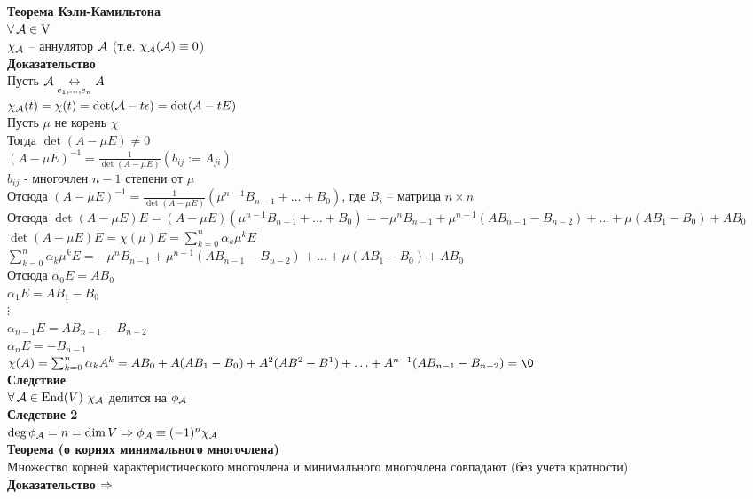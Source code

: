 \documentclass[12pt]{article}
\begin{document}
\textbf{Теорема Кэли-Камильтона}\\
$\forall\, \mathcal{A} \in \operatorname{V}$\\
$\chi_\mathcal{A}$ -- аннулятор $\mathcal{A}$ (т.е. $\chi_\mathcal{A}(\mathcal{A}) \equiv 0$)\\
\textbf{Доказательство}\\
Пусть $\mathcal{A} \underset{e_1, \ldots, e_n}{\leftrightarrow} A$\\
$\chi_\mathcal{A}(t) = \chi(t) = \det (\mathcal{A} - t\epsilon) = \det (A-tE)$\\
Пусть $\mu$ не корень $\chi$\\
Тогда $\det(A-\mu E) \neq 0$\\
$(A-\mu E)^{-1} = \frac1{\det(A - \mu E)}(b_{ij} := A_{ji})$\\
$b_{ij}$ - многочлен $n-1$ степени от $\mu$\\
Отсюда $(A-\mu E)^{-1} = \frac1{\det(A-\mu E)}(\mu^{n-1} B_{n-1} + \ldots + B_0)$, где $B_i$ -- матрица $n \times n$\\
Отсюда $\det (A-\mu E)E = (A-\mu E)(\mu^{n-1} B_{n-1} + \ldots + B_0) = -\mu^n B_{n-1} + \mu^{n-1}(AB_{n-1}-B_{n-2}) + \ldots + \mu (AB_1 - B_0) + AB_0$\\
$\det(A-\mu E)E = \chi(\mu) E = \sum_{k=0}^n \alpha_k \mu^k E$\\
$\sum_{k=0}^n \alpha_k \mu^k E = -\mu^n B_{n-1} + \mu^{n-1}(AB_{n-1}-B_{n-2}) + \ldots + \mu (AB_1 - B_0) + AB_0$\\
Отсюда $\alpha_0 E = AB_0$\\
$\alpha_1 E = AB_1 - B_0$\\
$\vdots$\\
$\alpha_{n-1} E = AB_{n-1} - B_{n-2}$\\
$\alpha_n E = -B_{n-1}$\\
$\chi (A) = \sum_{k=0}^n \alpha_k A^k = AB_0 + A(AB_1 - B_0) + A^2 (AB^2 - B^1) + \ldots + A^{n-1} (AB_{n-1}-B_{n-2}) = \0$\\
\textbf{Следствие}\\
$\forall\, \mathcal{A} \in \operatorname{End}(V)\ \chi_\mathcal{A}$ делится на $\phi_\mathcal{A}$\\
\textbf{Следствие 2}\\
$\deg \phi_\mathcal{A} = n = \dim V \Rightarrow \phi_\mathcal{A} \equiv (-1)^n\chi_\mathcal{A}$\\
\textbf{Теорема (о корнях минимального многочлена)}\\
Множество корней характеристического многочлена и минимального многочлена совпадают (без учета кратности)\\
\textbf{Доказательство $\Rightarrow$}\\
\end{document}
